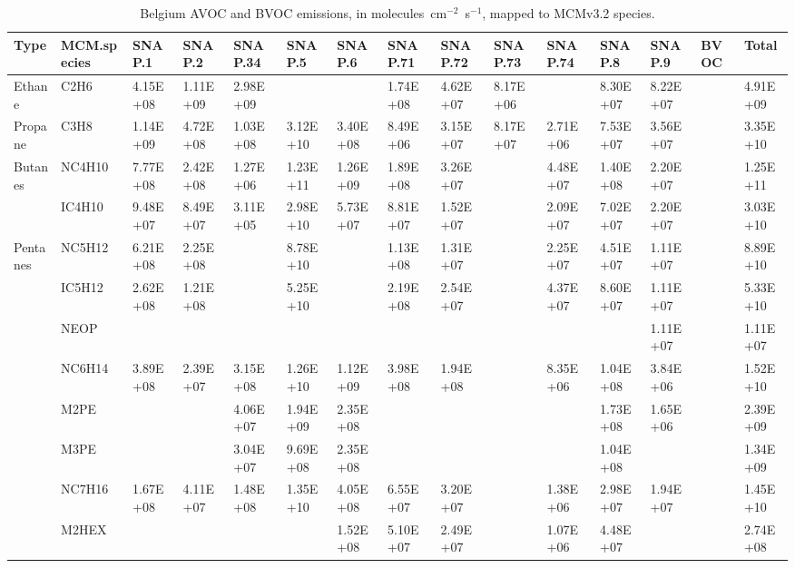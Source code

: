 \tiny
\begin{longtable}{lllllllllllllll}
	\caption{Belgium AVOC and BVOC emissions, in molecules~cm$^{-2}$~s$^{-1}$, mapped to MCMv3.2 species.}\\%
	\hline \hline
	\textbf{Type} & \textbf{MCM.species} & \textbf{SNAP.1} & \textbf{SNAP.2} & \textbf{SNAP.34} & \textbf{SNAP.5} & \textbf{SNAP.6} & \textbf{SNAP.71} & \textbf{SNAP.72} & \textbf{SNAP.73} & \textbf{SNAP.74} & \textbf{SNAP.8} & \textbf{SNAP.9} & \textbf{BVOC} & \textbf{Total}\\
	\endhead
	\hline
	Ethane & C2H6 & 4.15E+08 & 1.11E+09 & 2.98E+09 &  &  & 1.74E+08 & 4.62E+07 & 8.17E+06 &  & 8.30E+07 & 8.22E+07 &  & 4.91E+09 \\
	\hline Propane & C3H8 & 1.14E+09 & 4.72E+08 & 1.03E+08 & 3.12E+10 & 3.40E+08 & 8.49E+06 & 3.15E+07 & 8.17E+07 & 2.71E+06 & 7.53E+07 & 3.56E+07 &  & 3.35E+10 \\ \hline
	\multirow{2}{*}{Butanes} & NC4H10 & 7.77E+08 & 2.42E+08 & 1.27E+06 & 1.23E+11 & 1.26E+09 & 1.89E+08 & 3.26E+07 &  & 4.48E+07 & 1.40E+08 & 2.20E+07 &  & 1.25E+11 \\
	 & IC4H10 & 9.48E+07 & 8.49E+07 & 3.11E+05 & 2.98E+10 & 5.73E+07 & 8.81E+07 & 1.52E+07 &  & 2.09E+07 & 7.02E+07 & 2.20E+07 &  & 3.03E+10 \\
	\hline \multirow{3}{*}{Pentanes} & NC5H12 & 6.21E+08 & 2.25E+08 &  & 8.78E+10 &  & 1.13E+08 & 1.31E+07 &  & 2.25E+07 & 4.51E+07 & 1.11E+07 &  & 8.89E+10 \\
	 & IC5H12 & 2.62E+08 & 1.21E+08 &  & 5.25E+10 &  & 2.19E+08 & 2.54E+07 &  & 4.37E+07 & 8.60E+07 & 1.11E+07 &  & 5.33E+10 \\
	 & NEOP &  &  &  &  &  &  &  &  &  &  & 1.11E+07 &  & 1.11E+07 \\
	\hline \parbox[t]{2mm}{} & NC6H14 & 3.89E+08 & 2.39E+07 & 3.15E+08 & 1.26E+10 & 1.12E+09 & 3.98E+08 & 1.94E+08 &  & 8.35E+06 & 1.04E+08 & 3.84E+06 &  & 1.52E+10 \\
	 & M2PE &  &  & 4.06E+07 & 1.94E+09 & 2.35E+08 &  &  &  &  & 1.73E+08 & 1.65E+06 &  & 2.39E+09 \\
	 & M3PE &  &  & 3.04E+07 & 9.69E+08 & 2.35E+08 &  &  &  &  & 1.04E+08 &  &  & 1.34E+09 \\
	 & NC7H16 & 1.67E+08 & 4.11E+07 & 1.48E+08 & 1.35E+10 & 4.05E+08 & 6.55E+07 & 3.20E+07 &  & 1.38E+06 & 2.98E+07 & 1.94E+07 &  & 1.45E+10 \\
	 & M2HEX &  &  &  &  & 1.52E+08 & 5.10E+07 & 2.49E+07 &  & 1.07E+06 & 4.48E+07 &  &  & 2.74E+08 \\

\end{longtable}
